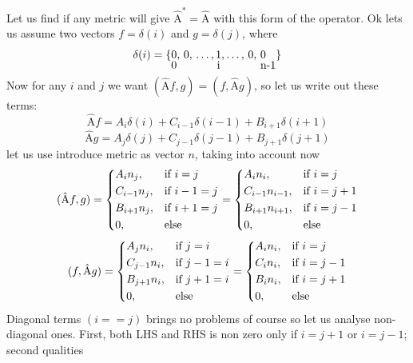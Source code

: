 \documentclass{article}
\newcommand{\op}[1]{\hat{\mathrm{#1}}}
\begin{document}
Let us find if any metric will give $\op A^* = \op A$ with this form of the operator.
Ok lets us assume two vectors $f = \delta(i)$ and $g = \delta(j)$, where
\[ \delta(i) = \{\ooalign{0\cr\raisebox{-2.2ex}{0}},\,0,\,\ldots,\ooalign{1\cr\hfil\raisebox{-2.2ex}{i}\hfil},\ldots,\, 0,\,\ooalign{0\cr\hfil\raisebox{-2.2ex}{n-1}\hfil}\} \]
Now for any $i$ and $j$ we want $(\op A f,g)=(f,\op A g)$, so let us write out these terms:
\[ \op A f = A_i \delta(i) + C_{i-1} \delta(i-1) + B_{i+1} \delta(i+1) \]
\[ \op A g = A_j \delta(j) + C_{j-1} \delta(j-1) + B_{j+1} \delta(j+1) \]
let us use introduce metric as vector $n$, taking into account now
\[ (\op A f, g) = \begin{dcases}
                  A_i n_j,& \text{if }  i=j\\
                  C_{i-1} n_j,& \text{if }  i-1=j\\
                  B_{i+1} n_j,& \text{if }  i+1=j\\
                  0,& \text{else}
                  \end{dcases}
                  = \begin{dcases}
                  A_i n_i,& \text{if }  i=j\\
                  C_{i-1} n_{i-1},& \text{if }  i=j+1\\
                  B_{i+1} n_{i+1},& \text{if }  i=j-1\\
                  0,& \text{else}
                  \end{dcases}
\]
\[ (f, \op A g) = \begin{dcases}
                  A_j n_i,& \text{if }  j=i\\
                  C_{j-1} n_i,& \text{if }  j-1=i\\
                  B_{j+1} n_i,& \text{if }  j+1=i\\
                  0,& \text{else}
                  \end{dcases}
                  = \begin{dcases}
                  A_i n_i,& \text{if }  i=j\\
                  C_{i} n_i,& \text{if }  i=j-1\\
                  B_{i} n_i,& \text{if }  i=j+1\\
                  0,& \text{else}
                  \end{dcases}
\]
Diagonal terms $(i==j)$ brings no problems of course so let us analyse non-diagonal ones. First, both LHS and RHS is non zero only if $i=j+1$ or $i=j-1$; second qualities
\end{document}
